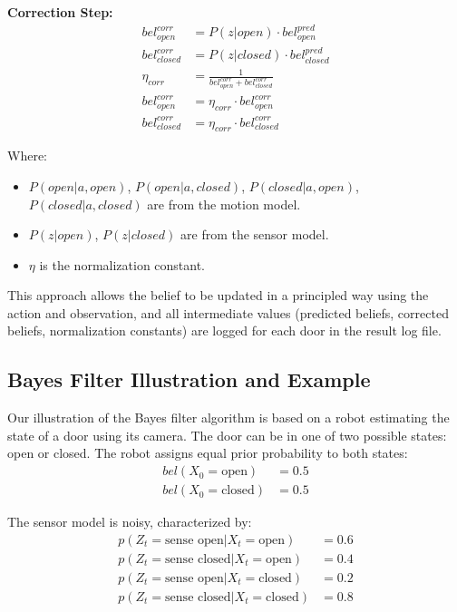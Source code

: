\documentclass[12pt]{article}
\begin{document}
\textbf{Correction Step:}
\begin{equation}
\begin{aligned}
bel_{open}^{corr} &= P(z|open) \cdot bel_{open}^{pred} \\
bel_{closed}^{corr} &= P(z|closed) \cdot bel_{closed}^{pred} \\
\eta_{corr} &= \frac{1}{bel_{open}^{corr} + bel_{closed}^{corr}} \\
bel_{open}^{corr} &= \eta_{corr} \cdot bel_{open}^{corr} \\
bel_{closed}^{corr} &= \eta_{corr} \cdot bel_{closed}^{corr}
\end{aligned}
\end{equation}

Where:
\begin{itemize}
  \item $P(open|a,open)$, $P(open|a,closed)$, $P(closed|a,open)$, $P(closed|a,closed)$ are from the motion model.
  \item $P(z|open)$, $P(z|closed)$ are from the sensor model.
  \item $\eta$ is the normalization constant.
\end{itemize}

This approach allows the belief to be updated in a principled way using the action and observation, and all intermediate values (predicted beliefs, corrected beliefs, normalization constants) are logged for each door in the result log file.
\subsection{Bayes Filter Illustration and Example}
Our illustration of the Bayes filter algorithm is based on a robot estimating the state of a door using its camera. The door can be in one of two possible states: open or closed. The robot assigns equal prior probability to both states:
\begin{align}
    bel(X_0 = \text{open}) &= 0.5 \\
    bel(X_0 = \text{closed}) &= 0.5
\end{align}

The sensor model is noisy, characterized by:
\begin{align}
    p(Z_t = \text{sense open} | X_t = \text{open}) &= 0.6 \\
    p(Z_t = \text{sense closed} | X_t = \text{open}) &= 0.4 \\
    p(Z_t = \text{sense open} | X_t = \text{closed}) &= 0.2 \\
    p(Z_t = \text{sense closed} | X_t = \text{closed}) &= 0.8
\end{align}
\end{document}
